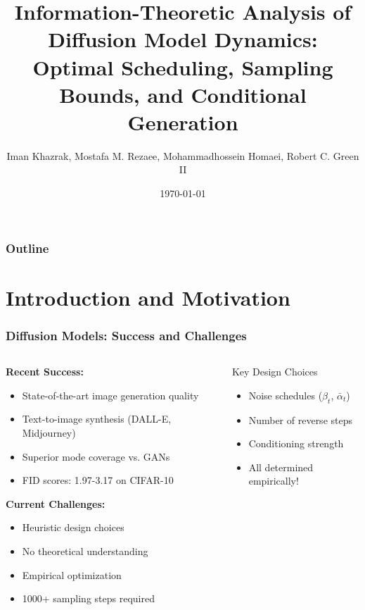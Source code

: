\documentclass[aspectratio=169]{beamer}
\title{Information-Theoretic Analysis of Diffusion Model Dynamics: Optimal Scheduling, Sampling Bounds, and Conditional Generation}
\author{Iman Khazrak, Mostafa M. Rezaee, Mohammadhossein Homaei, Robert C. Green II}
\institute{Bowling Green State University \& University of Extremadura}
\date{\today}
\begin{document}
\begin{frame}
\titlepage
\end{frame}

\begin{frame}
\frametitle{Outline}
\tableofcontents
\end{frame}

\section{Introduction and Motivation}

\begin{frame}
\frametitle{Diffusion Models: Success and Challenges}
\begin{columns}
\begin{column}{0.6\textwidth}
\textbf{Recent Success:}
\begin{itemize}
\item State-of-the-art image generation quality
\item Text-to-image synthesis (DALL-E, Midjourney)
\item Superior mode coverage vs. GANs
\item FID scores: 1.97-3.17 on CIFAR-10
\end{itemize}

\vspace{0.5cm}
\textbf{Current Challenges:}
\begin{itemize}
\item \textcolor{myred}{Heuristic design choices}
\item \textcolor{myred}{No theoretical understanding}
\item \textcolor{myred}{Empirical optimization}
\item \textcolor{myred}{1000+ sampling steps required}
\end{itemize}
\end{column}
\begin{column}{0.4\textwidth}
\begin{block}{Key Design Choices}
\begin{itemize}
\item Noise schedules ($\beta_t$, $\bar{\alpha}_t$)
\item Number of reverse steps
\item Conditioning strength
\item All determined empirically!
\end{itemize}
\end{block}
\end{column}
\end{columns}
\end{frame}
\end{document}
